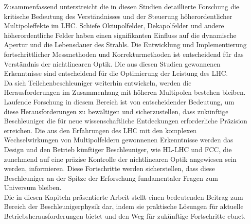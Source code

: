 {%
Zusammenfassend unterstreicht die in diesen Studien detaillierte Forschung die kritische Bedeutung des Verständnisses und der Steuerung höherordentlicher Multipoleffekte im LHC. Schiefe Oktupolfelder, Dekapolfelder und andere höherordentliche Felder haben einen signifikanten Einfluss auf die dynamische Apertur und die Lebensdauer des Strahls. Die Entwicklung und Implementierung fortschrittlicher Messmethoden und Korrekturmethoden ist entscheidend für das Verständnis der nichtlinearen Optik. Die aus diesen Studien gewonnenen Erkenntnisse sind entscheidend für die Optimierung der Leistung des LHC.  
\\
\indent
Da sich Teilchenbeschleuniger weiterhin entwickeln, werden die Herausforderungen im Zusammenhang mit höheren Multipolen bestehen bleiben. Laufende Forschung in diesem Bereich ist von entscheidender Bedeutung, um diese Herausforderungen zu bewältigen und sicherzustellen, dass zukünftige Beschleuniger die für neue wissenschaftliche Entdeckungen erforderliche Präzision erreichen. Die aus den Erfahrungen des LHC mit den komplexen Wechselwirkungen von Multipolfeldern gewonnenen Erkenntnisse werden das Design und den Betrieb künftiger Beschleuniger, wie HL-LHC und FCC, die zunehmend auf eine präzise Kontrolle der nichtlinearen Optik angewiesen sein werden, informieren. Diese Fortschritte werden sicherstellen, dass diese Beschleuniger an der Spitze der Erforschung fundamentaler Fragen zum Universum bleiben.  
\\
\indent
Die in diesen Kapiteln präsentierte Arbeit stellt einen bedeutenden Beitrag zum Bereich der Beschleunigerphysik dar, indem sie praktische Lösungen für aktuelle Betriebsherausforderungen bietet und den Weg für zukünftige Fortschritte ebnet.


}